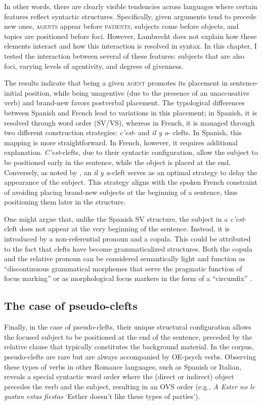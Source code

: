 In other words, there are clearly visible tendencies across languages where certain features reflect syntactic structures. Specifically, given arguments tend to precede new ones, \textsc{agents} appear before \textsc{patients}, subjects come before objects, and topics are positioned before foci. However, Lambrecht does not explain how these elements interact and how this interaction is resolved in syntax.
In this chapter, I tested the interaction between several of these features: subjects that are also foci, varying levels of agentivity, and degrees of givenness.

The results indicate that being a given \textsc{agent} promotes its placement in sen\-tence-initial position, while being unagentive (due to the presence of an unaccusative verb) and brand-new favors postverbal placement. The typological differences between Spanish and French lead to variations in this placement; in Spanish, it is resolved through word order (SV/VS), whereas in French, it is managed through two different construction strategies: \textit{c'est}- and \textit{il y a}- clefts.
In Spanish, this mapping is more straightforward. In French, however, it requires additional explanation. \textit{C'est}-clefts, due to their syntactic configuration, allow the subject to be positioned early in the sentence, while the object is placed at the end. Conversely, as noted by \textcite{lambrecht2010constraints}, an \textit{il y a}-cleft serves as an optimal strategy to delay the appearance of the subject. This strategy aligns with the spoken French constraint of avoiding placing brand-new subjects at the beginning of a sentence, thus positioning them later in the structure.

One might argue that, unlike the Spanish SV structure, the subject in a \textit{c'est}-cleft does not appear at the very beginning of the sentence. Instead, it is introduced by a non-referential pronoun and a copula. This could be attributed to the fact that clefts have become grammaticalized structures. Both the copula and the relative pronoun can be considered semantically light and function as ``discontinuous grammatical morphemes that serve the pragmatic function of focus marking” \parencite[197]{wehr2011phrase} or as morphological focus markers in the form of a ``circumfix” \parencite[126]{haase2000franzosische}.

\subsection{The case of pseudo-clefts} \label{sub:6.10.5}
Finally, in the case of pseudo-clefts, their unique structural configuration allows the focused subject to be positioned at the end of the sentence, preceded by the relative clause that typically constitutes the background material. In the corpus, pseudo-clefts are rare but are always accompanied by OE-psych verbs. Observing these types of verbs in other Romance languages, such as Spanish or Italian, reveals a special syntactic word order where the (direct or indirect) object precedes the verb and the subject, resulting in an OVS order (e.g., \textit{A Ester no le gustan estas fiestas} `Esther doesn’t like these types of parties').

